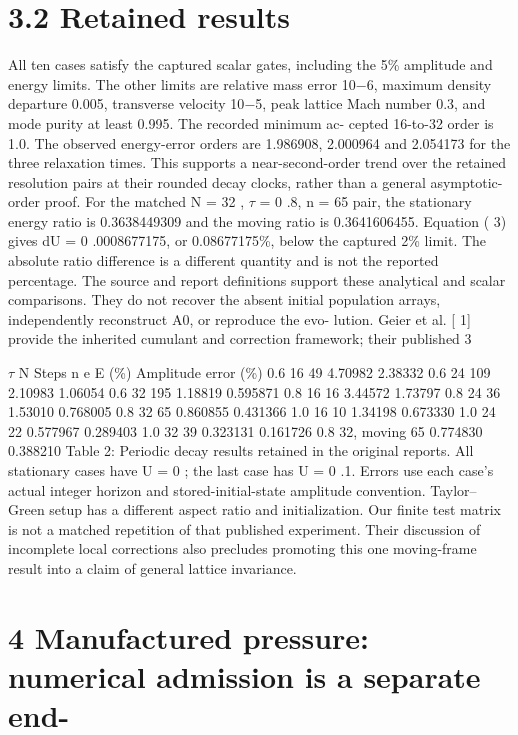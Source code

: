 \documentclass[11pt]{article}
\begin{document}
\section*{3.2 Retained results}

All ten cases satisfy the captured scalar gates, including the 5\% amplitude and energy limits. The
other limits are relative mass error 10\ensuremath{-}6, maximum density departure 0.005, transverse velocity
10\ensuremath{-}5, peak lattice Mach number 0.3, and mode purity at least 0.995. The recorded minimum ac-
cepted 16-to-32 order is 1.0. The observed energy-error orders are 1.986908, 2.000964 and 2.054173
for the three relaxation times. This supports a near-second-order trend over the retained resolution
pairs at their rounded decay clocks, rather than a general asymptotic-order proof.
For the matched N = 32 , \ensuremath{\tau} = 0 .8, n = 65 pair, the stationary energy ratio is 0.3638449309 and
the moving ratio is 0.3641606455. Equation ( 3) gives dU = 0 .0008677175, or 0.08677175\%, below
the captured 2\% limit. The absolute ratio difference is a different quantity and is not the reported
percentage.
The source and report definitions support these analytical and scalar comparisons. They do not
recover the absent initial population arrays, independently reconstruct A0, or reproduce the evo-
lution. Geier et al. [ 1] provide the inherited cumulant and correction framework; their published
3

\ensuremath{\tau} N Steps n e E (\%) Amplitude error (\%)
0.6 16 49 4.70982 2.38332
0.6 24 109 2.10983 1.06054
0.6 32 195 1.18819 0.595871
0.8 16 16 3.44572 1.73797
0.8 24 36 1.53010 0.768005
0.8 32 65 0.860855 0.431366
1.0 16 10 1.34198 0.673330
1.0 24 22 0.577967 0.289403
1.0 32 39 0.323131 0.161726
0.8 32, moving 65 0.774830 0.388210
Table 2: Periodic decay results retained in the original reports. All stationary cases have U = 0 ;
the last case has U = 0 .1. Errors use each case’s actual integer horizon and stored-initial-state
amplitude convention.
Taylor–Green setup has a different aspect ratio and initialization. Our finite test matrix is not a
matched repetition of that published experiment. Their discussion of incomplete local corrections
also precludes promoting this one moving-frame result into a claim of general lattice invariance.

\section*{4 Manufactured pressure: numerical admission is a separate end-}
\end{document}
